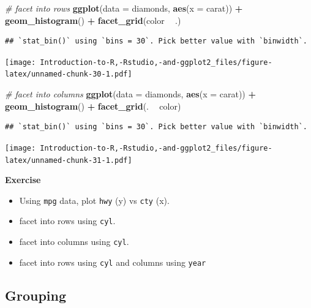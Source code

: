 \documentclass[]{book}
\newenvironment{Shaded}{\begin{snugshade}}{\end{snugshade}}
\newcommand{\CommentTok}[1]{\textcolor[rgb]{0.56,0.35,0.01}{\textit{#1}}}
\newcommand{\DataTypeTok}[1]{\textcolor[rgb]{0.13,0.29,0.53}{#1}}
\newcommand{\KeywordTok}[1]{\textcolor[rgb]{0.13,0.29,0.53}{\textbf{#1}}}
\newcommand{\NormalTok}[1]{#1}
\newcommand{\OperatorTok}[1]{\textcolor[rgb]{0.81,0.36,0.00}{\textbf{#1}}}
\newcommand{\StringTok}[1]{\textcolor[rgb]{0.31,0.60,0.02}{#1}}
\begin{document}
\begin{Shaded}
\begin{Highlighting}[]
\CommentTok{# facet into rows}
\KeywordTok{ggplot}\NormalTok{(}\DataTypeTok{data =}\NormalTok{ diamonds, }\KeywordTok{aes}\NormalTok{(}\DataTypeTok{x =}\NormalTok{ carat)) }\OperatorTok{+}\StringTok{ }\KeywordTok{geom_histogram}\NormalTok{() }\OperatorTok{+}\StringTok{ }\KeywordTok{facet_grid}\NormalTok{(color }\OperatorTok{~}\StringTok{ }\NormalTok{.)}
\end{Highlighting}
\end{Shaded}

\begin{verbatim}
## `stat_bin()` using `bins = 30`. Pick better value with `binwidth`.
\end{verbatim}

\texttt{[image: Introduction-to-R,-Rstudio,-and-ggplot2\_files/figure-latex/unnamed-chunk-30-1.pdf]}

\begin{Shaded}
\begin{Highlighting}[]
\CommentTok{# facet into columns}
\KeywordTok{ggplot}\NormalTok{(}\DataTypeTok{data =}\NormalTok{ diamonds, }\KeywordTok{aes}\NormalTok{(}\DataTypeTok{x =}\NormalTok{ carat)) }\OperatorTok{+}\StringTok{ }\KeywordTok{geom_histogram}\NormalTok{() }\OperatorTok{+}\StringTok{ }\KeywordTok{facet_grid}\NormalTok{(. }\OperatorTok{~}\StringTok{ }\NormalTok{color)}
\end{Highlighting}
\end{Shaded}

\begin{verbatim}
## `stat_bin()` using `bins = 30`. Pick better value with `binwidth`.
\end{verbatim}

\texttt{[image: Introduction-to-R,-Rstudio,-and-ggplot2\_files/figure-latex/unnamed-chunk-31-1.pdf]}

\textbf{Exercise}

\begin{itemize}
\item
  Using \texttt{mpg} data, plot \texttt{hwy} (y) vs \texttt{cty} (x).
\item
  facet into rows using \texttt{cyl}.
\item
  facet into columns using \texttt{cyl}.
\item
  facet into rows using \texttt{cyl} and columns using \texttt{year}
\end{itemize}

\hypertarget{grouping}{%
\subsection{Grouping}\label{grouping}}
\end{document}
